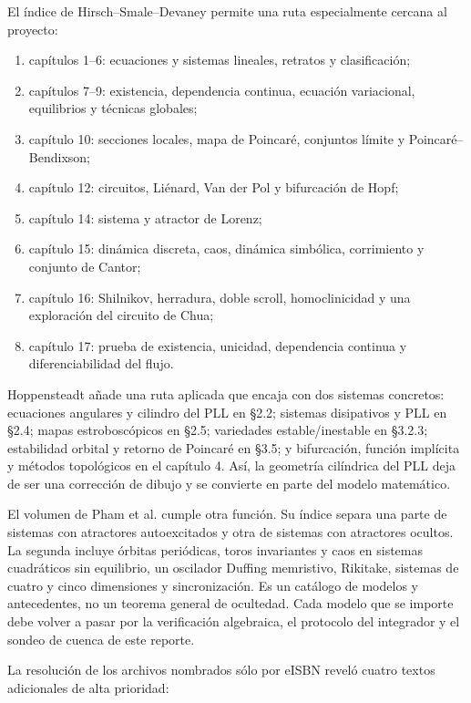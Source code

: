 El índice de Hirsch--Smale--Devaney
\cite{HirschSmaleDevaney2013} permite una ruta especialmente cercana al
proyecto:
\begin{enumerate}
 \item capítulos 1--6: ecuaciones y sistemas lineales, retratos y
 clasificación;
 \item capítulos 7--9: existencia, dependencia continua, ecuación variacional,
 equilibrios y técnicas globales;
 \item capítulo 10: secciones locales, mapa de Poincaré, conjuntos límite y
 Poincaré--Bendixson;
 \item capítulo 12: circuitos, Liénard, Van der Pol y bifurcación de Hopf;
 \item capítulo 14: sistema y atractor de Lorenz;
 \item capítulo 15: dinámica discreta, caos, dinámica simbólica, corrimiento y
 conjunto de Cantor;
 \item capítulo 16: Shilnikov, herradura, doble scroll, homoclinicidad y una
 exploración del circuito de Chua;
 \item capítulo 17: prueba de existencia, unicidad, dependencia continua y
 diferenciabilidad del flujo.
\end{enumerate}

Hoppensteadt \cite{Hoppensteadt2000Chaotic} añade una ruta aplicada que encaja
con dos sistemas concretos: ecuaciones angulares y cilindro del PLL en
\S2.2; sistemas disipativos y PLL en \S2.4; mapas estroboscópicos en \S2.5;
variedades estable/inestable en \S3.2.3; estabilidad orbital y retorno de
Poincaré en \S3.5; y bifurcación, función implícita y métodos topológicos en el
capítulo 4. Así, la geometría cilíndrica del PLL deja de ser una corrección de
dibujo y se convierte en parte del modelo matemático.

El volumen de Pham et al. \cite{PhamEtAl2018HiddenAttractors} cumple otra
función. Su índice separa una parte de sistemas con atractores autoexcitados y
otra de sistemas con atractores ocultos. La segunda incluye órbitas
periódicas, toros invariantes y caos en sistemas cuadráticos sin equilibrio,
un oscilador Duffing memristivo, Rikitake, sistemas de cuatro y cinco
dimensiones y sincronización. Es un catálogo de modelos y antecedentes, no un
teorema general de ocultedad. Cada modelo que se importe debe volver a pasar
por la verificación algebraica, el protocolo del integrador y el sondeo de cuenca
de este reporte.

La resolución de los archivos nombrados sólo por eISBN reveló cuatro textos
adicionales de alta prioridad:

